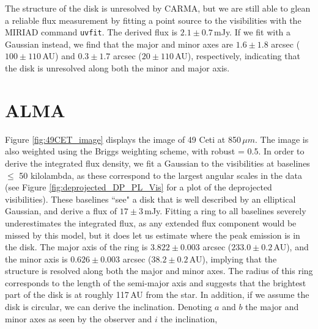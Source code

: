 

The structure of the disk is unresolved by CARMA, but we are still able to glean a reliable flux measurement by fitting a point source to the visibilities with the MIRIAD command \texttt{uvfit}. The derived flux is $2.1 \pm 0.7$\,mJy. If we fit with a Gaussian instead, we find that the major and minor axes are $1.6 \pm 1.8$ arcsec ($100 \pm 110$\,AU) and $0.3 \pm 1.7$ arcsec ($20 \pm 110$\,AU), respectively, indicating that the disk is unresolved along both the minor and major axis. 

\section{ALMA}
Figure \ref{fig:49CET_image} displays the image of 49 Ceti at 850\,$\mu m$. The image is also weighted using the Briggs weighting scheme, with robust = 0.5. In order to derive the integrated flux density, we fit a Gaussian to the visibilities at baselines $\leq$ 50 kilolambda, as these correspond to the largest angular scales in the data (see Figure \ref{fig:deprojected_DP_PL_Vis} for a plot of the deprojected visibilities). These baselines ``see" a disk that is well described by an elliptical Gaussian, and derive a flux of $17 \pm 3$\,mJy. Fitting a ring to all baselines severely underestimates the integrated flux, as any extended flux component would be missed by this model, but it does let us estimate where the peak emission is in the disk. The major axis of the ring is $3.822 \pm 0.003$ arcsec ($233.0 \pm 0.2$\,AU), and the minor axis is $0.626 \pm 0.003$ arcsec ($38.2 \pm 0.2$\,AU), implying that the structure is resolved along both the major and minor axes. The radius of this ring corresponds to the length of the semi-major axis and suggests that the brightest part of the disk is at roughly 117\,AU from the star. In addition, if we assume the disk is circular, we can derive the inclination. Denoting $a$ and $b$ the major and minor axes as seen by the observer and $i$ the inclination,


